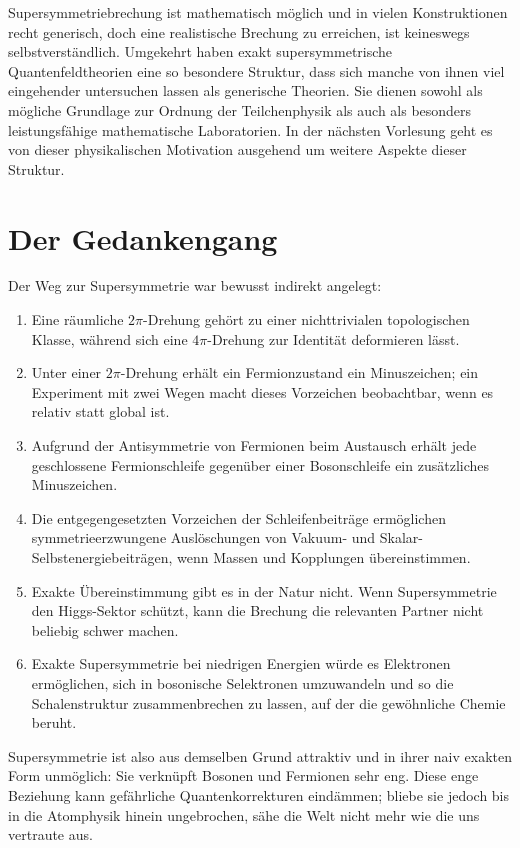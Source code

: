 Supersymmetriebrechung ist mathematisch möglich und in vielen Konstruktionen recht generisch, doch eine realistische Brechung zu erreichen, ist keineswegs selbstverständlich. Umgekehrt haben exakt supersymmetrische Quantenfeldtheorien eine so besondere Struktur, dass sich manche von ihnen viel eingehender untersuchen lassen als generische Theorien. Sie dienen sowohl als mögliche Grundlage zur Ordnung der Teilchenphysik als auch als besonders leistungsfähige mathematische Laboratorien. In der nächsten Vorlesung geht es von dieser physikalischen Motivation ausgehend um weitere Aspekte dieser Struktur.

\section{Der Gedankengang}

Der Weg zur Supersymmetrie war bewusst indirekt angelegt:
\begin{enumerate}
\item Eine räumliche \(2\pi\)-Drehung gehört zu einer nichttrivialen topologischen Klasse, während sich eine \(4\pi\)-Drehung zur Identität deformieren lässt.
\item Unter einer \(2\pi\)-Drehung erhält ein Fermionzustand ein Minuszeichen; ein Experiment mit zwei Wegen macht dieses Vorzeichen beobachtbar, wenn es relativ statt global ist.
\item Aufgrund der Antisymmetrie von Fermionen beim Austausch erhält jede geschlossene Fermionschleife gegenüber einer Bosonschleife ein zusätzliches Minuszeichen.
\item Die entgegengesetzten Vorzeichen der Schleifenbeiträge ermöglichen symmetrieerzwungene Auslöschungen von Vakuum- und Skalar-Selbstenergiebeiträgen, wenn Massen und Kopplungen übereinstimmen.
\item Exakte Übereinstimmung gibt es in der Natur nicht. Wenn Supersymmetrie den Higgs-Sektor schützt, kann die Brechung die relevanten Partner nicht beliebig schwer machen.
\item Exakte Supersymmetrie bei niedrigen Energien würde es Elektronen ermöglichen, sich in bosonische Selektronen umzuwandeln und so die Schalenstruktur zusammenbrechen zu lassen, auf der die gewöhnliche Chemie beruht.
\end{enumerate}

Supersymmetrie ist also aus demselben Grund attraktiv und in ihrer naiv exakten Form unmöglich: Sie verknüpft Bosonen und Fermionen sehr eng. Diese enge Beziehung kann gefährliche Quantenkorrekturen eindämmen; bliebe sie jedoch bis in die Atomphysik hinein ungebrochen, sähe die Welt nicht mehr wie die uns vertraute aus.